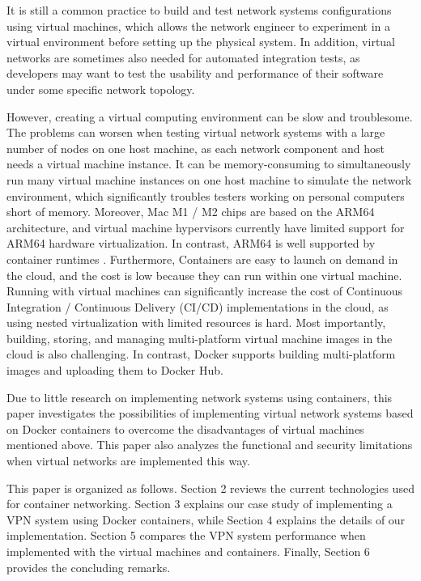 \documentclass[article]{aaltoseries}
\begin{document}
It is still a common practice \cite{9151942} to build and test network systems configurations using virtual machines, which allows the network engineer to experiment in a virtual environment before setting up the physical system. In addition, virtual networks are sometimes also needed for automated integration tests, as developers may want to test the usability and performance of their software under some specific network topology.

However, creating a virtual computing environment can be slow and troublesome. The problems can worsen when testing virtual network systems with a large number of nodes on one host machine, as each network component and host needs a virtual machine instance. It can be memory-consuming to simultaneously run many virtual machine instances on one host machine to simulate the network environment, which significantly troubles testers working on personal computers short of memory. Moreover, Mac M1 / M2 chips are based on the ARM64 architecture, and virtual machine hypervisors currently have limited support for ARM64 hardware virtualization. In contrast, ARM64 is well supported by container runtimes \cite{9852232}. Furthermore, Containers are easy to launch on demand in the cloud, and the cost is low because they can run within one virtual machine. Running with virtual machines can significantly increase the cost of Continuous Integration / Continuous Delivery (CI/CD) implementations in the cloud, as using nested virtualization with limited resources is hard. Most importantly, building, storing, and managing multi-platform virtual machine images in the cloud is also challenging. In contrast, Docker supports building multi-platform images \cite{dockermultiplatform} and uploading them to Docker Hub.

Due to little research on implementing network systems using containers, this paper investigates the possibilities of implementing virtual network systems based on Docker containers to overcome the disadvantages of virtual machines mentioned above. This paper also analyzes the functional and security limitations when virtual networks are implemented this way.

This paper is organized as follows. Section 2 reviews the current technologies used for container networking. Section 3 explains our case study of implementing a VPN system using Docker containers, while Section 4 explains the details of our implementation. Section 5 compares the VPN system performance when implemented with the virtual machines and containers. Finally, Section 6 provides the concluding remarks.
\end{document}
